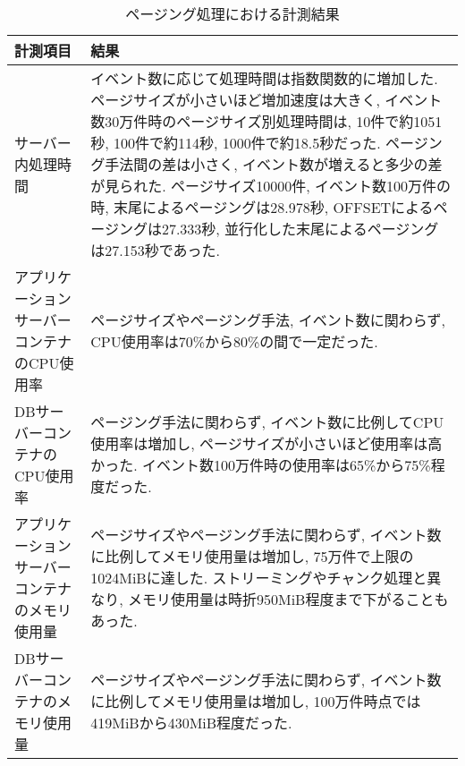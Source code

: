 \documentclass[../../../main]{subfiles}
\begin{document}
    \begin{table}[H]
        \centering
        \caption{ページング処理における計測結果}
        \label{tab:result-paging}
        \begin{tabular}{|p{4cm}|p{10cm}|}
            \hline
            \textbf{計測項目}                & \textbf{結果}                                                                                                                                                                                                                                     \\ \hline
            サーバー内処理時間                    & イベント数に応じて処理時間は指数関数的に増加した. ページサイズが小さいほど増加速度は大きく, イベント数30万件時のページサイズ別処理時間は, 10件で約1051秒, 100件で約114秒, 1000件で約18.5秒だった. ページング手法間の差は小さく, イベント数が増えると多少の差が見られた. ページサイズ10000件, イベント数100万件の時, 末尾によるページングは28.978秒, OFFSETによるページングは27.333秒, 並行化した末尾によるページングは27.153秒であった.  \\ \hline
            アプリケーションサーバーコンテナのCPU使用率      & ページサイズやページング手法, イベント数に関わらず, CPU使用率は70\%から80\%の間で一定だった.                                                                                                                                                                                             \\ \hline
            DBサーバーコンテナのCPU使用率            & ページング手法に関わらず, イベント数に比例してCPU使用率は増加し, ページサイズが小さいほど使用率は高かった. イベント数100万件時の使用率は65\%から75\%程度だった.                                                                                                                                                          \\ \hline
            アプリケーションサーバーコンテナのメモリ使用量      & ページサイズやページング手法に関わらず, イベント数に比例してメモリ使用量は増加し, 75万件で上限の1024MiBに達した. ストリーミングやチャンク処理と異なり, メモリ使用量は時折950MiB程度まで下がることもあった.                                                                                                                                    \\ \hline
            DBサーバーコンテナのメモリ使用量            & ページサイズやページング手法に関わらず, イベント数に比例してメモリ使用量は増加し, 100万件時点では419MiBから430MiB程度だった.                                                                                                                                                                           \\ \hline

\end{tabular}
\end{table}
\end{document}
